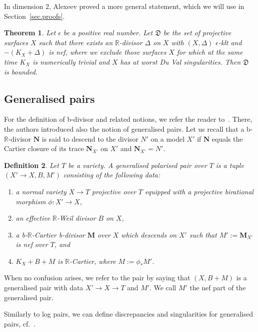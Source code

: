 \documentclass{amsart}[12pt,a4paper]
\newtheorem{theorem}{Theorem}[section]
\newtheorem{definition}[theorem]{Definition}
\theoremstyle{definition}
\newcommand{\rr}{\mathbb{R}}
\begin{document}
In dimension $2$, Alexeev proved a more general statement, which we will use in Section~\ref{sec.proofs}.

\begin{theorem}
\cite[Theorem~6.8]{Ale94}
\label{alexeev.thm}
Let $\epsilon$ be a positive real number. 
Let $\mathfrak D$ be the set of projective surfaces $X$ such that there exists an $\rr$-divisor $\Delta$ on $X$ with $(X,\Delta)$ $\epsilon$-klt and $-(K_X + \Delta)$ is nef, where we exclude those surfaces $X$ for which at the same time $K_X$ is numerically trivial and $X$ has at worst Du Val singularities. 
Then $\mathfrak D$ is bounded.
\end{theorem}

\subsection{Generalised pairs}
\label{sect.gen.pair} 
For the definition of b-divisor and related notions, we refer the reader to~\cite{bir.zhang}.
There, the authors introduced also the notion of generalised pairs. 
Let us recall that a b-$\mathbb{R}$-divisor $\mathbf{N}$ is said to descend to the divisor $N'$ on a model $X'$ if $\mathbf{N}$ equals the Cartier closure of its trace $\mathbf{N}_{X'}$ on $X'$ and $\mathbf{N}_{X'}=N'$.
\begin{definition}
Let $T$ be a variety. 
A generalised polarised pair over $T$ is a tuple $(X' \to X, B, M')$ consisting of the following data:
\begin{enumerate}
\item a normal variety $X \to T$ projective over $T$ equipped with a projective birational morphism $\phi \colon X' \rightarrow X$, 
\item an effective $\mathbb{R}$-Weil divisor $B$ on $X$,
\item a b-$\mathbb{R}$-Cartier b-divisor $\mathbf{M}$ over $X$ which descends on $X'$ such that $M':=\mathbf{M}_{X'}$ is nef over $T$, and
\item $K_X +B+ M$ is $\mathbb R$-Cartier, where $M := \phi_\ast M'$.
\end{enumerate}
\end{definition}

When no confusion arises, we refer to the pair by saying that $(X, B+M)$ is a generalised pair with data $X' \rightarrow X \rightarrow T$ and $M'$. 
We call $M'$ the nef part of the generalised pair.

Similarly to log pairs, we can define discrepancies and singularities for generalised pairs, cf.~\cite[Definition~4.1]{bir.zhang}. 
\end{document}
